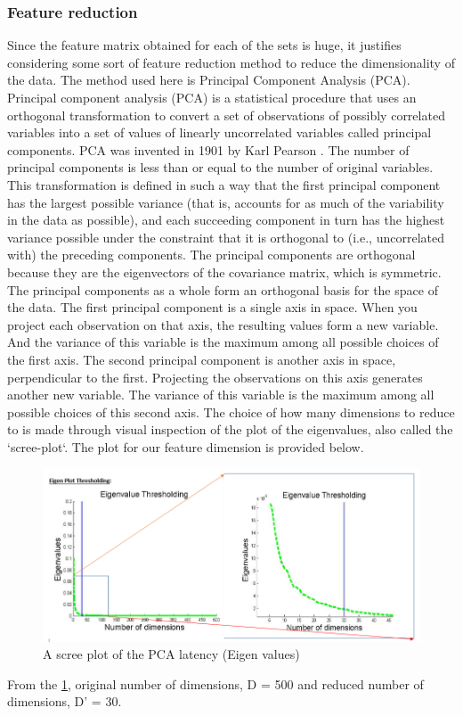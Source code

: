 \documentclass[letterpaper,12pt, onecolumn]{article}%
\begin{document}
\subsubsection*{Feature reduction}
Since the feature matrix obtained for each of the sets is huge, it justifies considering some sort of feature reduction method to reduce the dimensionality of the data. The method used here is Principal Component Analysis (PCA). Principal component analysis (PCA) is a statistical procedure that uses an orthogonal transformation to convert a set of observations of possibly correlated variables into a set of values of linearly uncorrelated variables called principal components. PCA was invented in 1901 by Karl Pearson \citep{jolliffe2005principal}. The number of principal components is less than or equal to the number of original variables. This transformation is defined in such a way that the first principal component has the largest possible variance (that is, accounts for as much of the variability in the data as possible), and each succeeding component in turn has the highest variance possible under the constraint that it is orthogonal to (i.e., uncorrelated with) the preceding components. The principal components are orthogonal because they are the eigenvectors of the covariance matrix, which is symmetric. The principal components as a whole form an orthogonal basis for the space of the data. The first principal component is a single axis in space. When you project each observation on that axis, the resulting values form a new variable. And the variance of this variable is the maximum among all possible choices of the first axis. The second principal component is another axis in space, perpendicular to the first. Projecting the observations on this axis generates another new variable. The variance of this variable is the maximum among all possible choices of this second axis.
The choice of how many dimensions to reduce to is made through visual inspection of the plot of the eigenvalues, also called the `scree-plot`. The plot for our feature dimension is provided below.
\begin{figure}[!hbtp]
 	  \centering
 	   \includegraphics[scale=0.65] {fig_eigValPlot.png} 
 	   \caption{A scree plot of the PCA latency (Eigen values)}
       \label{fig:pcaScreePlot}
\end{figure}
From the \cref{fig:pcaScreePlot}, original number of dimensions, D = 500 and reduced number of dimensions, D' = 30.
\end{document}
